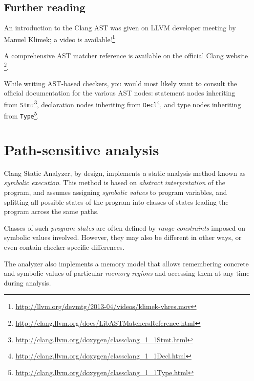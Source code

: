 \documentclass[a4paper,12pt]{article}
\begin{document}
\subsection{Further reading}

An introduction to the Clang AST was given on LLVM developer meeting by Manuel Klimek; a video is available!\footnote{\url{http://llvm.org/devmtg/2013-04/videos/klimek-vhres.mov}}

A comprehensive AST matcher reference is available on the official Clang website \footnote{\url{http://clang.llvm.org/docs/LibASTMatchersReference.html}}.

While writing AST-based checkers, you would most likely want to consult the official documentation for the various AST nodes:  statement nodes inheriting from \lstinline|Stmt|\footnote{\url{http://clang.llvm.org/doxygen/classclang_1_1Stmt.html}}, declaration nodes inheriting from \lstinline|Decl|\footnote{\url{http://clang.llvm.org/doxygen/classclang_1_1Decl.html}}, and type nodes inheriting from \lstinline|Type|\footnote{\url{http://clang.llvm.org/doxygen/classclang_1_1Type.html}}.

\newpage
\section{Path-sensitive analysis}\label{sec:path_sensitive}

Clang Static Analyzer, by design, implements a static analysis method known as \emph{symbolic execution}. This method is based on \emph{abstract interpretation} of the program, and assumes assigning \emph{symbolic values} to program variables, and splitting all possible states of the program into classes of states leading the program across the same paths.

Classes of such \emph{program states} are often defined by \emph{range constraints} imposed on symbolic values involved. However, they may also be different in other ways, or even contain checker-specific differences.

The analyzer also implements a memory model that allows remembering concrete and symbolic values of particular \emph{memory regions} and accessing them at any time during analysis.
\end{document}
